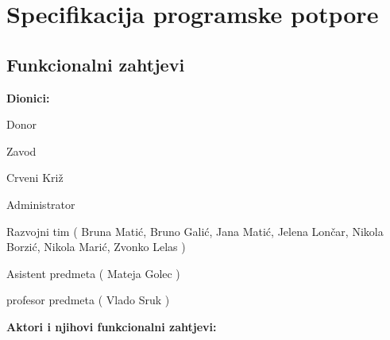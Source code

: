 \chapter{Specifikacija programske potpore}
		
	\section{Funkcionalni zahtjevi}
			
			\noindent \textbf{Dionici:}
			
			\begin{packed_enum}
				
				\item Donor
				\item Zavod
				\item Crveni Križ
				\item Administrator
				\item Razvojni tim ( Bruna Matić, Bruno Galić, Jana Matić, Jelena Lončar, Nikola Borzić, Nikola Marić, Zvonko Lelas )
				\item Asistent predmeta ( Mateja Golec )
				\item profesor predmeta ( Vlado Sruk )
				
			\end{packed_enum}
			
			\noindent \textbf{Aktori i njihovi funkcionalni zahtjevi:}
			
